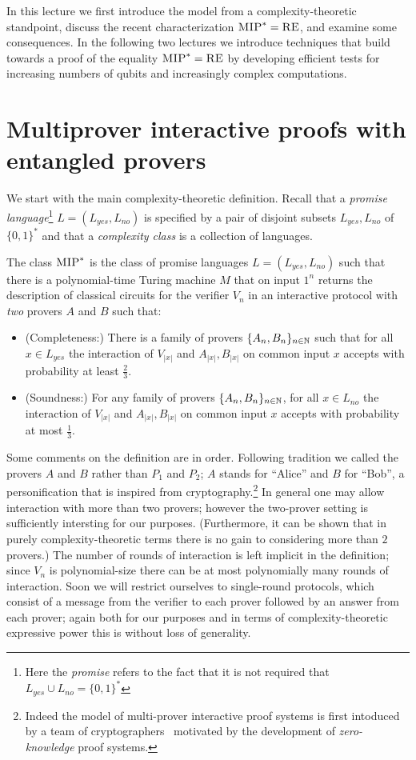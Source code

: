 In this lecture we first introduce the model from a complexity-theoretic standpoint, discuss the recent characterization $\textsc{MIP}^*=\textsc{RE}$, and examine some consequences. In the following two lectures we introduce techniques that build towards a proof of the equality $\textsc{MIP}^*=\textsc{RE}$ by developing efficient tests for  increasing numbers of qubits and increasingly complex computations. 


\section{Multiprover interactive proofs  with entangled provers}

We start with the main complexity-theoretic definition. Recall that a \emph{promise language}\footnote{Here the \emph{promise} refers to the fact that it is not required that $L_{yes}\cup L_{no} = \{0,1\}^*$}  $L=(L_{yes},L_{no})$ is specified by a pair of disjoint subsets $L_{yes},L_{no}$ of $\{0,1\}^*$ and that a \emph{complexity class} is a collection of languages. 

\begin{definition} \label{def:mipstar}
The class $\textsc{MIP}^*$ is the class of promise languages $L = (L_{yes}, L_{no})$ such that there is a polynomial-time Turing machine $M$ that on input $1^n$ returns the description of classical circuits for the verifier $V_n$ in an interactive protocol with \emph{two} provers $A$ and $B$ such that: 
\begin{itemize}
\item (Completeness:) There is a family of provers $\{A_n,B_n\}_{n\in \mathbb{N}}$ 
such that for all $x\in L_{yes}$ the interaction of $V_{|x|}$ and $A_{|x|}, B_{|x|}$ on common input $x$ accepts with probability at least $\frac{2}{3}$.
\item (Soundness:) For any family of provers $\{A_n,B_n\}_{n\in \mathbb{N}}$, for all $x\in L_{no}$ the interaction of $V_{|x|}$ and $A_{|x|},B_{|x|}$ on common input $x$ accepts with probability at most $\frac{1}{3}$.
\end{itemize}
\end{definition}

Some comments on the definition are in order. Following tradition we called the provers $A$ and $B$ rather than $P_1$ and $P_2$; $A$ stands for ``Alice'' and $B$ for ``Bob'', a personification that is inspired from cryptography.\footnote{Indeed the model of multi-prover interactive proof systems is first intoduced by a team of cryptographers~\cite{ben2019multi} motivated by the development of \emph{zero-knowledge} proof systems.}
 In general one may allow interaction with more than two provers; however the two-prover setting is sufficiently intersting for our purposes. (Furthermore, it can be shown that in purely complexity-theoretic terms there is no gain to considering more than $2$ provers.) The number of rounds of interaction is left implicit in the definition; since $V_n$ is polynomial-size there can be at most polynomially many rounds of interaction. Soon we will restrict ourselves to single-round protocols, which consist of a message from the verifier to each prover followed by an answer from each prover; again both for our purposes and in terms of complexity-theoretic expressive power this is without loss of generality.  

